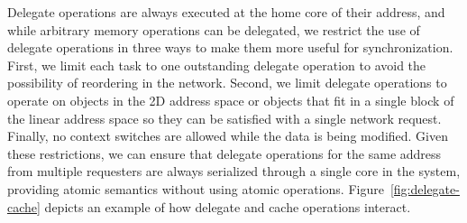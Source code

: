 Delegate operations are always executed at the home core of their
address, and while arbitrary memory operations can be delegated, we
restrict the use of delegate operations in three ways to make them more
useful for synchronization. First, we limit each task to one outstanding
delegate operation to avoid the possibility of reordering in the
network. Second, we limit delegate operations to operate on objects in
the 2D address space or objects that fit in a single block of the linear
address space so they can be satisfied with a single network request.
Finally, no context switches are allowed while the data is being
modified. Given these restrictions, we can ensure that delegate
operations for the same address from multiple requesters are always
serialized through a single core in the system, providing atomic
semantics without using atomic operations. 
Figure~\ref{fig:delegate-cache} depicts an example of how delegate and
cache operations interact.

